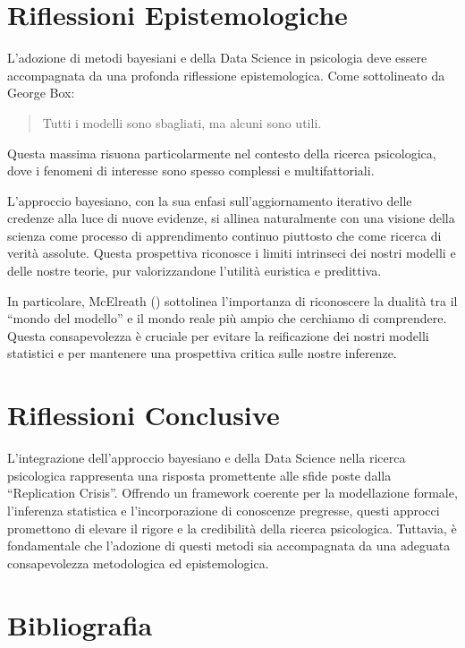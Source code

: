 \documentclass[
  letterpaper,
]{krantz}
\begin{document}
\section{Riflessioni Epistemologiche}\label{riflessioni-epistemologiche}

L'adozione di metodi bayesiani e della Data Science in psicologia deve
essere accompagnata da una profonda riflessione epistemologica. Come
sottolineato da George Box:

\begin{quote}
Tutti i modelli sono sbagliati, ma alcuni sono utili.
\end{quote}

Questa massima risuona particolarmente nel contesto della ricerca
psicologica, dove i fenomeni di interesse sono spesso complessi e
multifattoriali.

L'approccio bayesiano, con la sua enfasi sull'aggiornamento iterativo
delle credenze alla luce di nuove evidenze, si allinea naturalmente con
una visione della scienza come processo di apprendimento continuo
piuttosto che come ricerca di verità assolute. Questa prospettiva
riconosce i limiti intrinseci dei nostri modelli e delle nostre teorie,
pur valorizzandone l'utilità euristica e predittiva.

In particolare, McElreath ()
sottolinea l'importanza di riconoscere la dualità tra il ``mondo del
modello'' e il mondo reale più ampio che cerchiamo di comprendere.
Questa consapevolezza è cruciale per evitare la reificazione dei nostri
modelli statistici e per mantenere una prospettiva critica sulle nostre
inferenze.

\section{Riflessioni Conclusive}\label{riflessioni-conclusive-3}

L'integrazione dell'approccio bayesiano e della Data Science nella
ricerca psicologica rappresenta una risposta promettente alle sfide
poste dalla ``Replication Crisis''. Offrendo un framework coerente per
la modellazione formale, l'inferenza statistica e l'incorporazione di
conoscenze pregresse, questi approcci promettono di elevare il rigore e
la credibilità della ricerca psicologica. Tuttavia, è fondamentale che
l'adozione di questi metodi sia accompagnata da una adeguata
consapevolezza metodologica ed epistemologica.

\section*{Bibliografia}\label{bibliografia-4}
\end{document}

